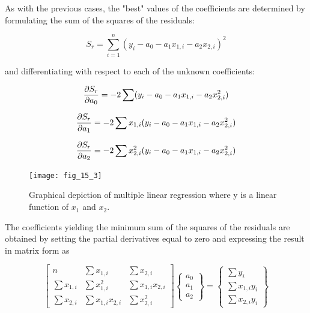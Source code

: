 \documentclass[../main.tex]{subfiles}
\begin{document}
As with the previous cases, the "best" values of the coefficients are determined by formulating the sum of the squares of the residuals:

\begin{equation}
	\tag{15.4}
	S_r = \sum_{i=1}^n (y_i - a_0 - a_1x_{1,i} - a_2x_{2,i})^2
\end{equation}

\noindent and differentiating with respect to each of the unknown coefficients:

\begin{equation}
	\notag
	\frac{\partial S_r}{\partial a_0} = -2 \sum (y_i -a_0 -a_1x_{1,i} - a_2x_{2,i}^2)
\end{equation}

\begin{equation}
	\notag
	\frac{\partial S_r}{\partial a_1} = -2 \sum x_{1,i} (y_i -a_0 -a_1x_{1,i} - a_2x_{2,i}^2)
\end{equation}

\begin{equation}
	\notag
	\frac{\partial S_r}{\partial a_2} = -2 \sum x_{2,i}^2 (y_i -a_0 -a_1x_{1,i} - a_2x_{2,i}^2)
\end{equation}

\begin{figure}
    \centering
    \texttt{[image: fig\_15\_3]}
   \caption{\textsf{Graphical depiction of multiple linear regression where y is a linear function of $x_1$ and $x_2$.}}
   \label{fig:fig_15_3}
\end{figure}

\noindent The coefficients yielding the minimum sum of the squares of the residuals are obtained by setting the partial derivatives equal to zero and expressing the result in matrix form as 

\begin{equation} %
	\tag{15.5}
	\begin{bmatrix}
		n & \sum x_{1,i} & \sum x_{2,i} \\
		\sum x_{1,i} & \sum x_{1,i}^2 & \sum x_{1,i} x_{2,i} \\
		\sum x_{2,i} & \sum x_{1,i} x_{2,i} & \sum x_{2,i}^2
	\end{bmatrix}
	\begin{Bmatrix}
		a_0 \\ a_1 \\ a_2
	\end{Bmatrix} =
	\begin{Bmatrix}
		\sum y_i \\ \sum x_{1,i} y_i \\ \sum x_{2,i} y_i
	\end{Bmatrix}
\end{equation}
\end{document}
